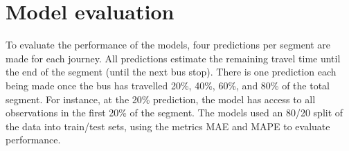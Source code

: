\section{Model evaluation}
To evaluate the performance of the models, four predictions per segment are made for each journey. All predictions estimate the remaining travel time until the end of the segment (until the next bus stop). There is one prediction each being made once the bus has travelled 20\%, 40\%, 60\%, and 80\% of the total segment. For instance, at the 20\% prediction, the model has access to all observations in the first 20\% of the segment. The models used an 80/20 split of the data into train/test sets, using the metrics MAE and MAPE to evaluate performance.

